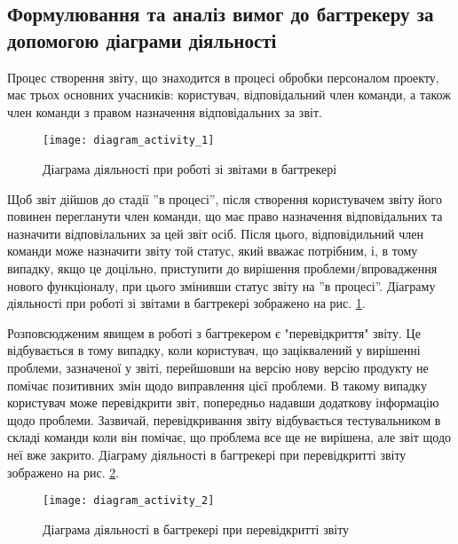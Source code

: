 \documentclass[../main.tex]{subfiles}
\begin{document}
	
	\subsection{Формулювання та аналіз вимог до багтрекеру за допомогою діаграми діяльності}
		Процес створення звіту, що знаходится в процесі обробки персоналом проекту, має трьох основних учасників: користувач, відповідальний член команди, а також член команди з правом назначення відповідальних за звіт.
		
		\begin{figure}[H]
			\centering
			\texttt{[image: diagram\_activity\_1]}
			\caption{Діаграма діяльності при роботі зі звітами в багтрекері}
			\label{diag_activity}
		\end{figure}
		
		Щоб звіт дійшов до стадії ''в процесі'', після створення користувачем звіту його повинен перегланути член команди, що має право назначення відповідальних та назначити відповілальних за цей звіт осіб. Після цього, відповідильний член команди може назначити звіту той статус, який вважає потрібним, і, в тому випадку, якщо це доцільно, приступити до вирішення проблеми/впровадження нового функціоналу, при цього змінивши статус звіту на ''в процесі''. Діаграму діяльності при роботі зі звітами в багтрекері зображено на рис. \ref{diag_activity}.
		
		Розповсюдженим явищем в роботі з багтрекером є "перевідкриття" звіту. Це відбувається в тому випадку, коли користувач, що заціквалений у вирішенні проблеми, зазначеної у звіті, перейшовши на версію нову версію продукту не помічає позитивних змін щодо виправлення цієї проблеми. В такому випадку користувач може перевідкрити звіт, попередньо надавши додаткову інформацію щодо проблеми. Зазвичай, перевідкривання звіту відбувається тестувальником в складі команди коли він помічає, що проблема все ще не вирішена, але звіт щодо неї вже закрито. Діаграму діяльності в багтрекері при перевідкритті звіту зображено на рис. \ref{diag_activity_2}.
		
		\begin{figure}[H]
			\centering
			\texttt{[image: diagram\_activity\_2]}
			\caption{Діаграма діяльності в багтрекері при перевідкритті звіту}
			\label{diag_activity_2}
		\end{figure}
	
\end{document}
